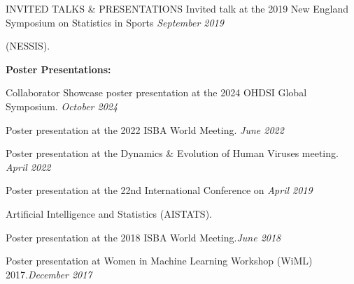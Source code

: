 \documentclass{resume} %
\begin{document}
\begin{rSection}{INVITED TALKS \& PRESENTATIONS}
	{Invited talk at the 2019 New England Symposium on Statistics in Sports} \hfill {\em September 2019}
	
	\vspace{-0.1in}
	(NESSIS).
	
	
	
	
	
	\medskip
	
	\hspace*{-0.2in}\textbf{Poster Presentations:}
	
	Collaborator Showcase poster presentation at the 2024 OHDSI Global Symposium.  \hfill {\em October 2024}
	
	Poster presentation at the 2022 ISBA World Meeting. \hfill {\em June 2022}
	
	Poster presentation at the Dynamics \& Evolution of Human Viruses meeting.  \hfill {\em April 2022}
	
	
	Poster presentation at the 22nd International Conference on   \hfill {\em April 2019}
	
	\vspace{-0.1in}
	Artificial Intelligence and Statistics (AISTATS).
	
	
	
	Poster presentation at the 2018 ISBA World Meeting.\hfill {\em June 2018}
	
	Poster presentation at Women in Machine Learning Workshop (WiML) 2017.\hfill {\em December 2017}
	
\end{rSection}









\end{document}
